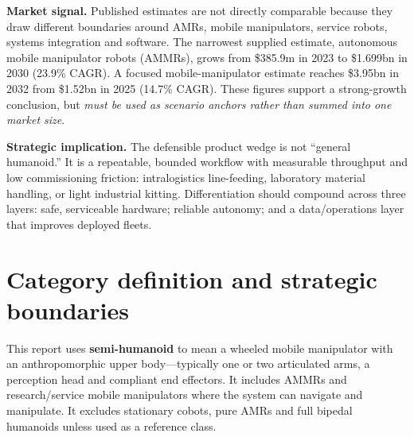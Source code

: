 \documentclass[11pt,a4paper]{article}
\begin{document}
\textbf{Market signal.} Published estimates are not directly comparable because they draw different boundaries around AMRs, mobile manipulators, service robots, systems integration and software. The narrowest supplied estimate, autonomous mobile manipulator robots (AMMRs), grows from \$385.9m in 2023 to \$1.699bn in 2030 (23.9\% CAGR). A focused mobile-manipulator estimate reaches \$3.95bn in 2032 from \$1.52bn in 2025 (14.7\% CAGR). These figures support a strong-growth conclusion, but \emph{must be used as scenario anchors rather than summed into one market size}.\cite{gvr,mnm}

\textbf{Strategic implication.} The defensible product wedge is not ``general humanoid.'' It is a repeatable, bounded workflow with measurable throughput and low commissioning friction: intralogistics line-feeding, laboratory material handling, or light industrial kitting. Differentiation should compound across three layers: safe, serviceable hardware; reliable autonomy; and a data/operations layer that improves deployed fleets.

\begin{center}
\end{center}

\section{Category definition and strategic boundaries}

This report uses \textbf{semi-humanoid} to mean a wheeled mobile manipulator with an anthropomorphic upper body---typically one or two articulated arms, a perception head and compliant end effectors. It includes AMMRs and research/service mobile manipulators where the system can navigate and manipulate. It excludes stationary cobots, pure AMRs and full bipedal humanoids unless used as a reference class.
\end{document}
